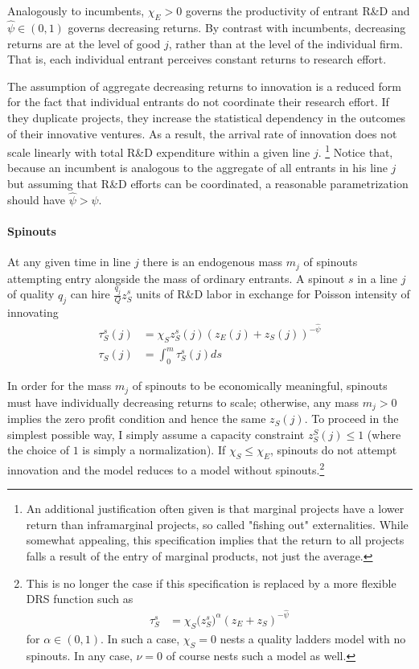 \documentclass[12pt,english]{article}
\theoremstyle{remark}
\begin{document}
Analogously to incumbents, $\chi_E > 0$ governs the productivity of entrant R\&D and $\hat{\psi} \in (0,1)$ governs decreasing returns. By contrast with incumbents, decreasing returns are at the level of good $j$, rather than at the level of the individual firm. That is, each individual entrant perceives constant returns to research effort.

The assumption of aggregate decreasing returns to innovation is a reduced form for the fact that individual entrants do not coordinate their research effort. If they duplicate projects, they increase the statistical dependency in the outcomes of their innovative ventures. As a result, the arrival rate of innovation does not scale linearly with total R\&D expenditure within a given line $j$. \footnote{An additional justification often given is that marginal projects have a lower return than inframarginal projects, so called "fishing out" externalities. While somewhat appealing, this specification implies that the return to all projects falls a result of the entry of marginal products, not just the average.} Notice that, because an incumbent is analogous to the aggregate of all entrants in his line $j$ but assuming that R\&D efforts can be coordinated, a reasonable parametrization should have $\hat{\psi} > \psi$. 

\paragraph{Spinouts}

At any given time in line $j$ there is an endogenous mass $m_j$ of spinouts attempting entry alongside the mass of ordinary entrants. A spinout $s$ in a line $j$ of quality $q_j$ can hire $ \frac{q_j}{Q} z_S^s$ units of R\&D labor in exchange for Poisson intensity of innovating
\begin{align}
\tau_S^s(j) &= \chi_S z_S^s(j) (z_E(j) + z_S(j))^{-\hat{\psi}}\label{spinout_entry_rate_eq} \\
\tau_S(j) &= \int_0^m \tau_S^s(j) ds \nonumber
\end{align}

In order for the mass $m_j$ of spinouts to be economically meaningful, spinouts must have individually decreasing returns to scale; otherwise, any mass $m_j > 0$ implies the zero profit condition and hence the same $z_S(j)$. To proceed in the simplest possible way, I simply assume a capacity constraint $z_S^S(j) \le 1$ (where the choice of $1$ is simply a normalization).  If $\chi_S \le \chi_E$, spinouts do not attempt innovation and the model reduces to a model without spinouts.\footnote{This is no longer the case if this specification is replaced by a more flexible DRS function such as 
	\begin{align}
	\tau_S^s &= \chi_S \Big(z_S^s\Big)^{\alpha} (z_E+ z_S)^{-\hat{\psi}} \nonumber
	\end{align}
	for $\alpha \in (0,1)$. In such a case, $\chi_S = 0$ nests a quality ladders model with no spinouts. In any case, $\nu = 0$ of course nests such a model as well. }
\end{document}
